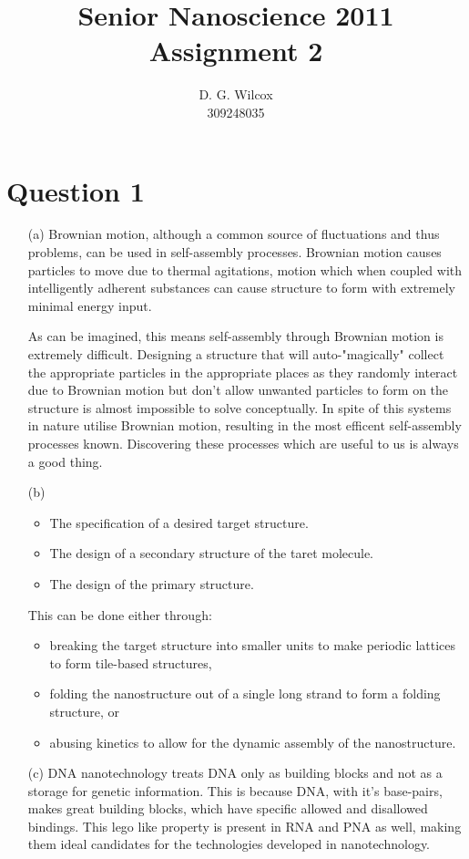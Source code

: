 \documentclass[10pt,a4paper]{article}
\title{Senior Nanoscience 2011 Assignment 2}
\date{}
\author{D. G. Wilcox \\
		309248035}
\begin{document}
\maketitle

\section*{Question 1}

\begin{itemize}
	\item[(a)] Brownian motion, although a common source of fluctuations and thus problems, can be used in self-assembly processes. Brownian motion causes particles to move due to thermal agitations, motion which when coupled with intelligently adherent substances can cause structure to form with extremely minimal energy input.

    As can be imagined, this means self-assembly through Brownian motion is extremely difficult. Designing a structure that will auto-"magically" collect the appropriate particles in the appropriate places as they randomly interact due to Brownian motion but don't allow unwanted particles to form on the structure is almost impossible to solve conceptually. In spite of this systems in nature utilise Brownian motion, resulting in the most efficent self-assembly processes known. Discovering these processes which are useful to us is always a good thing.
	\item[(b)] 
        \begin{itemize}
            \item The specification of a desired target structure.
            \item The design of a secondary structure of the taret molecule.
            \item The design of the primary structure.
        \end{itemize}
        This can be done either through:
        \begin{itemize}
            \item breaking the target structure into smaller units to make periodic lattices to form tile-based structures,
            \item folding the nanostructure out of a single long strand to form a folding structure, or
            \item abusing kinetics to allow for the dynamic assembly of the nanostructure.
        \end{itemize}
	\item[(c)] DNA nanotechnology treats DNA only as building blocks and not as a storage for genetic information. This is because DNA, with it's base-pairs, makes great building blocks, which have specific allowed and disallowed bindings. This lego like property is present in RNA and PNA as well, making them ideal candidates for the technologies developed in nanotechnology.
\end{itemize}
\end{document}

